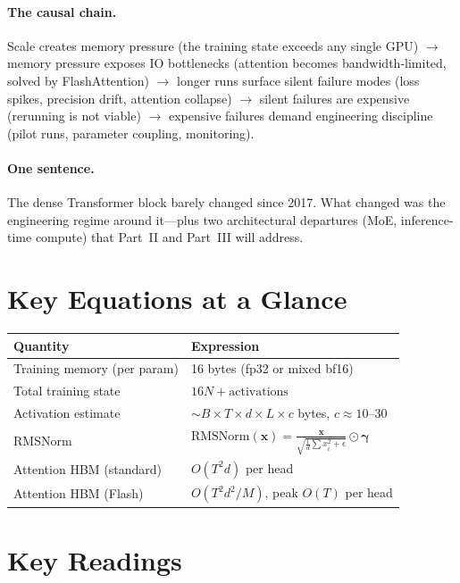 \paragraph{The causal chain.} Scale creates memory pressure (the training state exceeds any single GPU) $\to$ memory pressure exposes IO bottlenecks (attention becomes bandwidth-limited, solved by FlashAttention) $\to$ longer runs surface silent failure modes (loss spikes, precision drift, attention collapse) $\to$ silent failures are expensive (rerunning is not viable) $\to$ expensive failures demand engineering discipline (pilot runs, parameter coupling, monitoring).

\paragraph{One sentence.} The dense Transformer block barely changed since 2017. What changed was the engineering regime around it---plus two architectural departures (MoE, inference-time compute) that Part~II and Part~III will address.


\section*{Key Equations at a Glance}

\begin{center}
\begin{tabularx}{\textwidth}{@{}p{4cm}X@{}}
\toprule
\textbf{Quantity} & \textbf{Expression} \\
\midrule
Training memory (per param) & 16 bytes (fp32 or mixed bf16) \\
Total training state & $16N + \text{activations}$ \\
Activation estimate & $\sim B \times T \times d \times L \times c$ bytes, $c \approx 10$--$30$ \\
RMSNorm & $\text{RMSNorm}(\mathbf{x}) = \frac{\mathbf{x}}{\sqrt{\frac{1}{d}\sum x_i^2 + \epsilon}} \odot \boldsymbol{\gamma}$ \\
Attention HBM (standard) & $O(T^2 d)$ per head \\
Attention HBM (Flash) & $O(T^2 d^2 / M)$, peak $O(T)$ per head \\
\bottomrule
\end{tabularx}
\end{center}


\section*{Key Readings}


